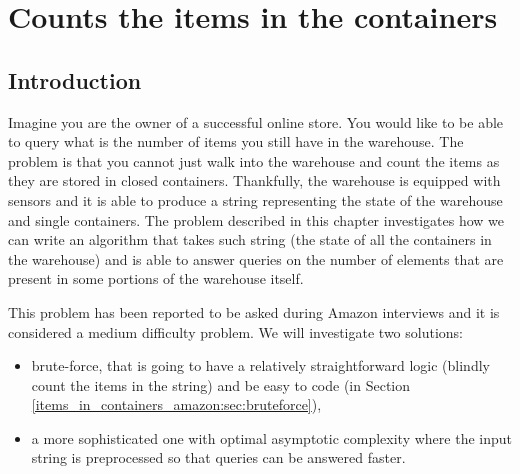 %

\chapter{Counts the items in the containers}
\label{ch:items_in_containers_amazon}
\section*{Introduction}
Imagine you are the owner of a successful online store. You would like to be able to query what is
the number of items you still have in the warehouse. The problem is that you cannot just walk into
the warehouse and count the items as they are stored in closed containers. Thankfully, the warehouse
is equipped with sensors and it is able to produce a string representing the state of the warehouse
and single containers. The problem described in this chapter investigates how we can write an
algorithm that takes such string (the state of all the containers in the warehouse) and is able to
answer queries on the number of elements that are present in some portions of the warehouse itself. 

This problem has been reported to be asked during Amazon interviews and it is considered a medium
difficulty problem. We will investigate two solutions:
\begin{itemize}
	\item brute-force, that is going to have a relatively straightforward logic (blindly count the
	 items in the string) and be easy to code (in Section
	 \ref{items_in_containers_amazon:sec:bruteforce}),
	\item a more sophisticated one with optimal asymptotic complexity where the input string is
	preprocessed so that queries can be answered faster.
\end{itemize}



